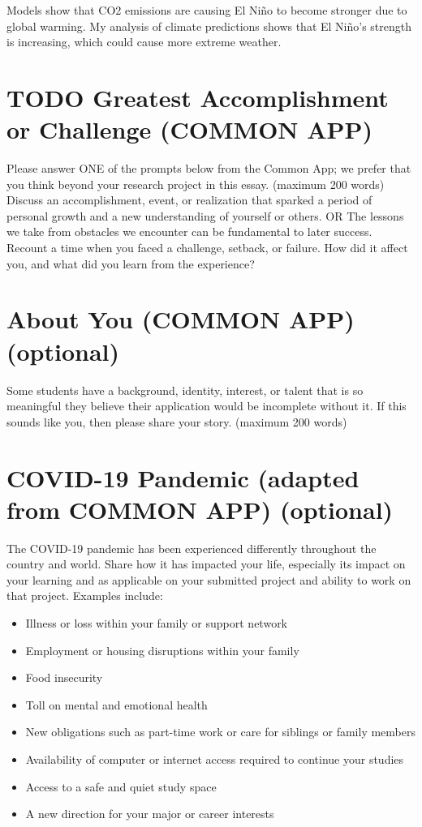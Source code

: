 \documentclass[little]{basic}
\begin{document}
Models show that CO2 emissions are causing El Niño to become stronger due to global warming. My analysis of climate predictions shows that El Niño's strength is increasing, which could cause more extreme weather.

\section{{\bfseries\sffamily TODO} Greatest Accomplishment or Challenge (COMMON APP)}
\label{sec:orgbdcedb2}
Please answer ONE of the prompts below from the Common App; we prefer that you think beyond your research project in this essay. (maximum 200 words)
Discuss an accomplishment, event, or realization that sparked a period of personal growth and a new understanding of yourself or others.
OR
The lessons we take from obstacles we encounter can be fundamental to later success. Recount a time when you faced a challenge, setback, or failure. How did it affect you, and what did you learn from the experience?

\section{About You (COMMON APP) (optional)}
\label{sec:orgfd10795}
Some students have a background, identity, interest, or talent that is so meaningful they believe their application would be incomplete without it. If this sounds like you, then please share your story. (maximum 200 words)

\section{COVID-19 Pandemic (adapted from COMMON APP) (optional)}
\label{sec:orgee7c2ff}

The COVID-19 pandemic has been experienced differently throughout the country and world. Share how it has impacted your life, especially its impact on your learning and as applicable on your submitted project and ability to work on that project. Examples include:
\begin{itemize}
\item Illness or loss within your family or support network
\item Employment or housing disruptions within your family
\item Food insecurity
\item Toll on mental and emotional health
\item New obligations such as part-time work or care for siblings or family members
\item Availability of computer or internet access required to continue your studies
\item Access to a safe and quiet study space
\item A new direction for your major or career interests
\end{itemize}
\end{document}
